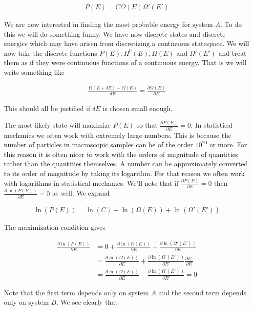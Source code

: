 \documentclass[12pt]{article}
\begin{document}
\begin{align}
P(E) = C \Omega(E)\Omega'(E')
\end{align}

We are now interested in finding the most probable energy for system $A$. To do this we will do something funny. We have now discrete states and discrete energies which may have arisen from discretizing a continuous statespace. We will now take the discrete functions $P(E), \Omega^0(E), \Omega(E)$ and $\Omega'(E')$ and treat them as if they were continuous functions of a continuous energy. That is we will write something like

\begin{align}
\frac{\Omega(E + \delta E) - \Omega(E)}{\delta E} = \frac{\partial\Omega(E)}{\partial E}
\end{align}

This should all be justified if $\delta E$ is chosen small enough.

The most likely state will maximize $P(E)$ so that $\frac{\partial P(E)}{\partial E} = 0$. In statistical mechanics we often work with extremely large numbers. This is because the number of particles in macroscopic samples can be of the order $10^{20}$ or more. For this reason it is often nicer to work with the orders of magnitude of quantities rather than the quantities themselves. A number can be approximately converted to its order of magnitude by taking its logarithm. For that reason we often work with logarithms in statistical mechanics. We'll note that if $\frac{\partial P(E)}{\partial E} = 0$ then $\frac{\partial \ln(P(E))}{\partial E} = 0$ as well. We expand

\begin{align}
\ln(P(E)) = \ln(C) + \ln(\Omega(E)) + \ln(\Omega'(E'))
\end{align}


The maximization condition gives

\begin{align}
\frac{\partial \ln(P(E))}{\partial E} &= 0 + \frac{\partial \ln(\Omega(E))}{\partial E} + \frac{\partial \ln(\Omega'(E'))}{\partial E}\\
&= \frac{\partial \ln(\Omega(E))}{\partial E} + \frac{\partial \ln(\Omega'(E'))}{\partial E'} \frac{\partial E'}{\partial E}\\
&= \frac{\partial \ln(\Omega(E))}{\partial E} - \frac{\partial \ln(\Omega'(E'))}{\partial E'} = 0
\end{align}

Note that the first term depends only on system $A$ and the second term depends only on system $B$. We see clearly that
\end{document}
